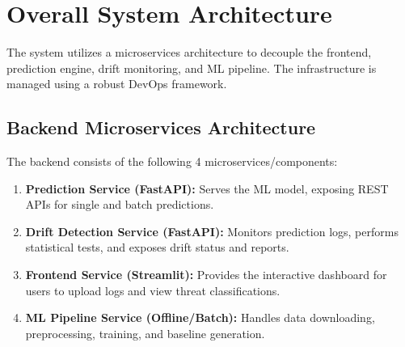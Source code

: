 \documentclass[12pt]{article}
\begin{document}

\section{Overall System Architecture}
The system utilizes a microservices architecture to decouple the frontend, prediction engine, drift monitoring, and ML pipeline. The infrastructure is managed using a robust DevOps framework.

\subsection{Backend Microservices Architecture}
The backend consists of the following 4 microservices/components:
\begin{enumerate}
    \item \textbf{Prediction Service (FastAPI):} Serves the ML model, exposing REST APIs for single and batch predictions.
    \item \textbf{Drift Detection Service (FastAPI):} Monitors prediction logs, performs statistical tests, and exposes drift status and reports.
    \item \textbf{Frontend Service (Streamlit):} Provides the interactive dashboard for users to upload logs and view threat classifications.
    \item \textbf{ML Pipeline Service (Offline/Batch):} Handles data downloading, preprocessing, training, and baseline generation.
\end{enumerate}
\end{document}
